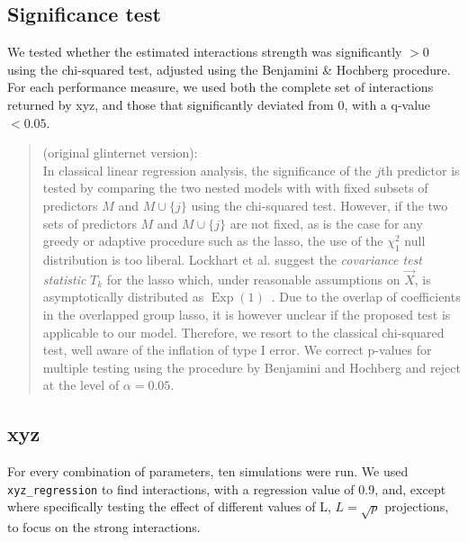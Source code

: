 \subsection{Significance test}
We tested whether the estimated interactions strength was significantly $> 0$ using the chi-squared test, adjusted using the Benjamini \& Hochberg procedure. For each performance measure, we used both the complete set of interactions returned by xyz, and those that significantly deviated from 0, with a q-value $< 0.05$.
~\\

\begin{quotation}
	(original glinternet version):\\
	In classical linear regression analysis, the significance of the $j$th predictor is tested by comparing the two nested models with with fixed subsets of predictors $M$ and $M \cup \{j\}$ using the chi-squared test. However, if the two sets of predictors $M$ and $M \cup \{j\}$ are not fixed, as is the case for any greedy or adaptive procedure such as the lasso, the use of the $\chi^2_1$ null distribution is too liberal. Lockhart et al. suggest the \emph{covariance test statistic} $T_k$ for the lasso which, under reasonable assumptions on $\vec{X}$, is asymptotically distributed as $\operatorname{Exp}(1)$~\cite{Lockhart:2013hm}. Due to the overlap of coefficients in the overlapped group lasso, it is however unclear if the proposed test is applicable to our model. Therefore, we resort to the classical chi-squared test, well aware of the inflation of type I error. We correct p-values for multiple testing using the procedure by Benjamini and Hochberg and reject at the level of $\alpha = 0.05$.
\end{quotation}

\subsection{xyz}
For every combination of parameters, ten simulations were run.
We used \verb|xyz_regression| to find interactions, with a regression value of 0.9, and, except where specifically testing the effect of different values of L, $L = \sqrt{p}$ projections, to focus on the strong interactions\cite{Thanei2016-wf}.

